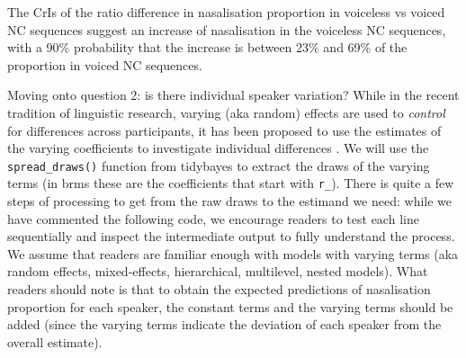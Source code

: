 \documentclass[
  authoryear,
  preprint,
  3p]{elsarticle}
\begin{document}
The CrIs of the ratio difference in nasalisation proportion in voiceless
vs voiced NC sequences suggest an increase of nasalisation in the
voiceless NC sequences, with a 90\% probability that the increase is
between 23\% and 69\% of the proportion in voiced NC sequences.

Moving onto question 2: is there individual speaker variation? While in
the recent tradition of linguistic research, varying (aka random)
effects are used to \emph{control} for differences across participants,
it has been proposed to use the estimates of the varying coefficients to
investigate individual differences \citep{tamminga2016}. We will use the
\texttt{spread\_draws()} function from tidybayes \citep{kay2019} to
extract the draws of the varying terms (in brms these are the
coefficients that start with \texttt{r\_}). There is quite a few steps
of processing to get from the raw draws to the estimand we need: while
we have commented the following code, we encourage readers to test each
line sequentially and inspect the intermediate output to fully
understand the process. We assume that readers are familiar enough with
models with varying terms (aka random effects, mixed-effects,
hierarchical, multilevel, nested models). What readers should note is
that to obtain the expected predictions of nasalisation proportion for
each speaker, the constant terms and the varying terms should be added
(since the varying terms indicate the deviation of each speaker from the
overall estimate).
\end{document}

